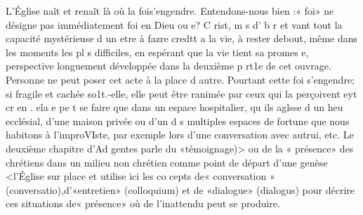 L'Église naît et renaît là où la fois'engendre. Entendons-nous bien :« foi»  ne désigne pas immédiatement foi en Dieu ou
e? C rist, m s d' b r et vant tout la capacité mystérieuse d un etre à fazre credtt a la vie, à rester debout, même dans les moments les pl s difficiles, en espérant que la vie tient sa promes e, perspective longuement développée dans la deuxième
p rt1e de cet ouvrage. Personne ne peut poser cet acte à la place d	autre. Pourtant cette foi s'engendre; si fragile et cachée so1t.-elle, elle peut être ranimée par ceux qui la perçoivent eyt cr en . ela e pe t se faire que dans un espace hospitalier, qu ils aglsse d un heu ecclésial, d'une maison privée ou d'un
d s multiples espaces de fortune que nous habitons à l'improVIste, par exemple lors d'une conversation avec autrui, etc. Le deuxième chapitre d'Ad gentes parle du «témoignage)> ou de la
« présence» des chrétiens dans un milieu non chrétien comme point de départ d'une genèse <l'Église sur place et utilise ici les co cepts de« conversation » (conversatio),d'«entretien» (colloquium) et de «dialogue» (dialogus) pour décrire ces situations de« présence» où de l'inattendu peut se produire.
